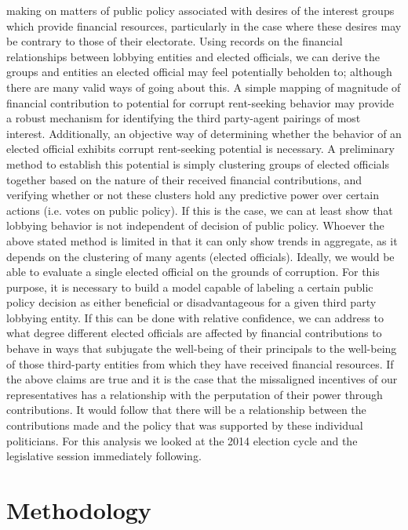 \documentclass[journal]{IEEEtran}
\begin{document}
making on matters of public policy associated with desires of the interest groups which provide financial resources, particularly
in the case where these desires may be contrary to those of their electorate. Using records on the financial relationships between 
lobbying entities and elected officials, we can derive the groups and entities an elected official may feel potentially beholden 
to; although there are many valid ways of going about this. A simple mapping of magnitude of financial contribution to potential for 
corrupt rent-seeking behavior may provide a robust mechanism for identifying the third party-agent pairings of most interest. 
Additionally, an objective way of determining whether the behavior of an elected official exhibits corrupt rent-seeking potential 
is necessary. A preliminary method to establish this potential is simply clustering groups of elected officials together based 
on the nature of their received financial contributions, and verifying whether or not these clusters hold any predictive power 
over certain actions (i.e. votes on public policy). If this is the case, we can at least show that lobbying behavior is not 
independent of decision of public policy. Whoever the above stated method is limited in that it can only show trends in aggregate, 
as it depends on the clustering of many agents (elected officials). Ideally, we would be able to evaluate a single elected official 
on the grounds of corruption. For this purpose, it is necessary to build a model capable of labeling a certain public policy 
decision as either beneficial or disadvantageous for a given third party lobbying entity. If this can be done with relative 
confidence, we can address to what degree different elected officials are affected by financial contributions to behave in ways 
that subjugate the well-being of their principals to the well-being of those third-party entities from which they have received 
financial resources.\newline
  If the above claims are true and it is the case that the missaligned incentives of our representatives has a relationship with the 
perputation of their power through contributions. It would follow that there will be a relationship between the contributions made
and the policy that was supported by these individual politicians. For this analysis we looked at the 2014 election cycle and the 
legislative session immediately following.
\section{Methodology}
\end{document}
